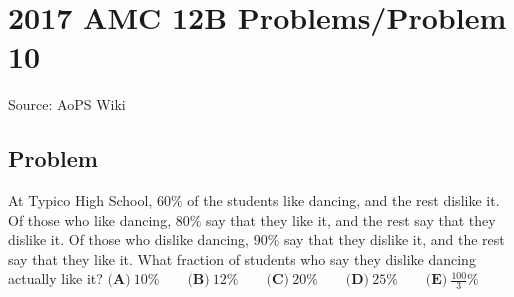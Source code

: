 \documentclass[12pt]{article}
\begin{document}
\section*{{2017 AMC 12B Problems/Problem 10}}
Source: AoPS Wiki

\subsection*{Problem}
At Typico High School, $60\%$ of the students like dancing, and the rest dislike it. Of those who like dancing, $80\%$ say that they like it, and the rest say that they dislike it. Of those who dislike dancing, $90\%$ say that they dislike it, and the rest say that they like it. What fraction of students who say they dislike dancing actually like it? $\textbf{(A)}\ 10\%\qquad\textbf{(B)}\ 12\%\qquad\textbf{(C)}\ 20\%\qquad\textbf{(D)}\ 25\%\qquad\textbf{(E)}\ \frac{100}{3}\%$
\end{document}
